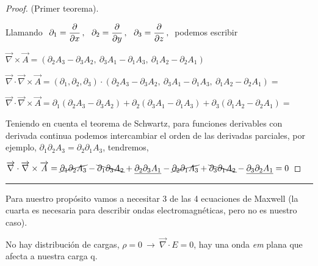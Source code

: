 \vspace{-5mm}
\begin{proof} (Primer teorema).

Llamando $\displaystyle \ \partial_1 = \pdv{x}\, , \ \ \partial_2 = \pdv{y}\, , \ \ \partial_3 = \pdv{z} \, , \ $ podemos escribir

$\overrightarrow \nabla \times \overrightarrow A = (\partial_2A_3-\partial_3A_2 , \ \partial_3A_1-\partial_1A_3 , \ \partial_1A_2 - \partial_2A_1)$

$\overrightarrow \nabla \cdot \overrightarrow \nabla \times \overrightarrow A = 
(\partial_1 , \partial_2 , \partial_3 ) \cdot 
(\partial_2A_3-\partial_3A_2 , \ \partial_3A_1-\partial_1A_3 , \ \partial_1A_2 - \partial_2A_1)=$

$\overrightarrow \nabla \cdot \overrightarrow \nabla \times \overrightarrow A =  \partial_1 (\partial_2A_3-\partial_3A_2 ) + \partial_2 ( \partial_3A_1-\partial_1A_3 ) +\partial_3 (\partial_1A_2 - \partial_2A_1)=$

Teniendo en cuenta el teorema de Schwartz, para funciones derivables con derivada continua podemos intercambiar el orden de las derivadas parciales, por ejemplo, $\partial_1 \partial_2 A_3 = \partial_2 \partial_1 A_3$, tendremos, 

$\overrightarrow \nabla \cdot \overrightarrow \nabla \times \overrightarrow A = \cancel{\partial_1 \partial_2A_3} - \bcancel{\partial_1 \partial_3A_2 } + \underline{\partial_2  \partial_3A_1}- \cancel{\partial_2 \partial_1A_3 } + \bcancel{\partial_3 \partial_1A_2} - \underline{\partial_3  \partial_2A_1}= 0$
	
\end{proof}

\vspace{-13mm}

\begin{flushright}
\rule{300pt}{0.1pt}	
\end{flushright}

\vspace{10mm}

Para nuestro propósito vamos a necesitar 3 de las 4 ecuaciones de Maxwell (la cuarta es necesaria para describir ondas electromagnéticas, pero no es nuestro caso).

\begin{small}\textcolor{gris}{No hay distribución de cargas, $\rho=0 \ \to \ \overrightarrow \nabla \cdot E =0$, hay una onda \emph{em} plana que afecta a nuestra carga q.}\end{small}

